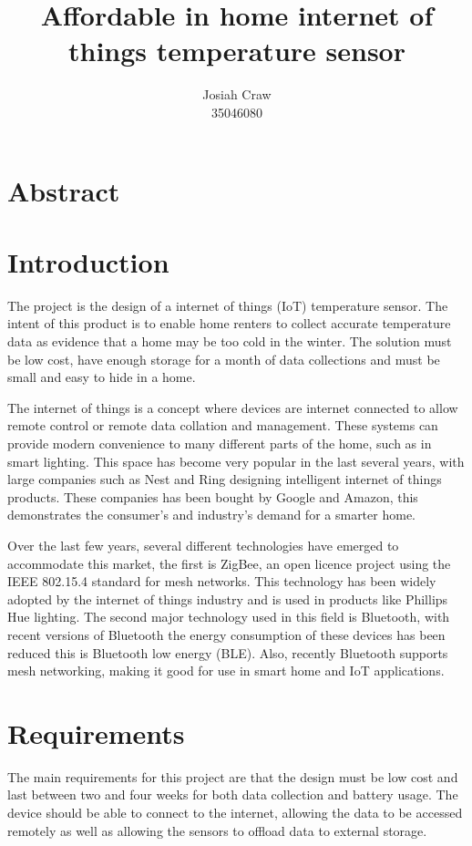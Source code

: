 \documentclass[12pt]{article}
\author{Josiah Craw\\35046080}
\title{\huge{Affordable in home internet of things temperature sensor}}
\begin{document}
\maketitle

\newpage

\section*{Abstract}

\newpage

\tableofcontents

\newpage

\section{Introduction}
The project is the design of a internet of things (IoT) temperature sensor. The intent of this
product is to enable home renters to collect accurate temperature data as evidence that a home may
be too cold in the winter. The solution must be low cost, have enough storage for a month of data
collections and must be small and easy to hide in a home. 

The internet of things is a concept where devices are internet connected to allow remote control
or remote data collation and management. These systems can provide modern convenience to many
different parts of the home, such as in smart lighting. This space has become very popular in the
last several years, with large companies such as Nest and Ring designing intelligent internet of
things products. These companies has been bought by Google and Amazon, this demonstrates the
consumer's and industry's demand for a smarter home.

Over the last few years, several different technologies have emerged to accommodate this market,
the first is ZigBee, an open licence project using the IEEE 802.15.4 standard for mesh networks.
This technology has been widely adopted by the internet of things industry and is used in products
like Phillips Hue lighting. The second major technology used in this field is Bluetooth, with
recent versions of Bluetooth the energy consumption of these devices has been reduced this is
Bluetooth low energy (BLE). Also, recently Bluetooth supports mesh networking, making it good for
use in smart home and IoT applications.

\section{Requirements}
The main requirements for this project are that the design must be low cost and last between two
and four weeks for both data collection and battery usage. The device should be able to connect to
the internet, allowing the data to be accessed remotely as well as allowing the sensors to offload
data to external storage.
\end{document}
